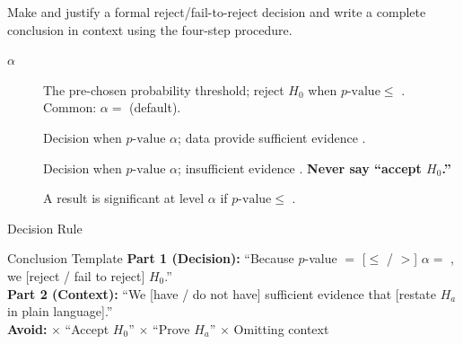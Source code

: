 \documentclass[10pt]{article}
\begin{document}
\namedateperiod

\vspace{0.15in}

\begin{objectivebox}
Make and justify a formal reject/fail-to-reject decision and write a complete conclusion in
context using the four-step procedure.
\end{objectivebox}

\begin{vocabbox}
\begin{description}
  \item[ $\alpha$] The pre-chosen probability threshold; reject
        $H_0$ when $p\text{-value} \le$ \blank{1.5cm}. Common: $\alpha =$ \blank{1.5cm} (default).
  \item[] Decision when $p\text{-value}$ \blank{1.5cm} $\alpha$; data provide
        sufficient evidence \blank{3cm}.
  \item[] Decision when $p\text{-value}$ \blank{1.5cm} $\alpha$; insufficient
        evidence \blank{4cm}. \textbf{Never say ``accept $H_0$.''}
  \item[] A result is significant at level $\alpha$ if
        $p\text{-value} \le$ \blank{1.5cm}.
\end{description}
\end{vocabbox}

\begin{notesbox}{Decision Rule}
\begin{center}
\end{center}
\end{notesbox}

\begin{notesbox}{Conclusion Template}
\textbf{Part 1 (Decision):} ``Because $p$-value $=$ \blank{1.5cm} [$ \le$ / $>$] $\alpha = $ \blank{1.5cm},
we [reject / fail to reject] $H_0$.''\\[6pt]
\textbf{Part 2 (Context):} ``We [have / do not have] sufficient evidence that \blank{8cm}
[restate $H_a$ in plain language].''\\[6pt]
\textbf{Avoid:} \textbf{$\times$} ``Accept $H_0$'' \quad \textbf{$\times$} ``Prove $H_a$'' \quad \textbf{$\times$} Omitting context
\end{notesbox}
\end{document}
